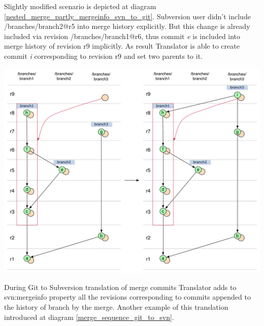Slightly modified scenario is depicted at diagram \ref{nested_merge_partly_mergeinfo_svn_to_git}. Subversion user didn't include /branches/branch2@r5 into merge history explicitly. But this change is already included via revision /branches/branch1@r6, thus commit \emph{e} is included into merge history of revision r9 implicitly. As result Translator is able to create commit \emph{i} corresponding to revision r9 and set two parents to it.

\begin{center}
\includegraphics[width=\textwidth]{img/diagrams/nested_merge_partly_mergeinfo_svn_to_git.pdf}%
\label{nested_merge_partly_mergeinfo_svn_to_git}%
\end{center}

During Git to Subversion translation of merge commits Translator adds to svn:mergeinfo property all the revisions corresponding to commits appended to the history of branch by the merge. Another example of this translation introduced at diagram \ref{merge_sequence_git_to_svn}.

